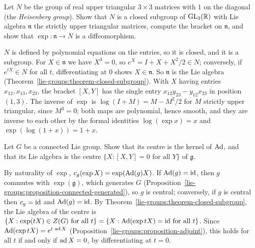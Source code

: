 \begin{exercise}\label{lie-groups:exercise-heisenberg}
Let $N$ be the group of real upper triangular $3 \times 3$ matrices with $1$ on the diagonal (the \emph{Heisenberg group}). Show that $N$ is a closed subgroup
of $\mathrm{GL}_3(\mathbb{R})$ with Lie algebra $\mathfrak{n}$ the strictly upper triangular matrices, compute the bracket on $\mathfrak{n}$, and show that
$\exp \colon \mathfrak{n} \to N$ is a diffeomorphism.
\end{exercise}

\begin{solution}
$N$ is defined by polynomial equations on the entries, so it is closed, and it is a subgroup. For $X \in \mathfrak{n}$ we have $X^3 = 0$, so
$e^X = I + X + X^2/2 \in N$; conversely, if $e^{tX} \in N$ for all $t$, differentiating at $0$ shows $X \in \mathfrak{n}$. So $\mathfrak{n}$ is the Lie algebra
(Theorem~\ref{lie-groups:theorem-closed-subgroup}). With $X$ having entries $x_{12}, x_{13}, x_{23}$, the bracket $[X, Y]$ has the single entry
$x_{12}y_{23} - y_{12}x_{23}$ in position $(1, 3)$. The inverse of $\exp$ is $\log(I + M) = M - M^2/2$ for $M$ strictly upper triangular, since $M^3 = 0$;
both maps are polynomial, hence smooth, and they are inverse to each other by the formal identities $\log(\exp x) = x$ and $\exp(\log(1 + x)) = 1 + x$.
\end{solution}

\begin{exercise}\label{lie-groups:exercise-centre}
Let $G$ be a connected Lie group. Show that its centre is the kernel of $\operatorname{Ad}$, and that its Lie algebra is the centre
$\{X : [X, Y] = 0 \text{ for all } Y\}$ of $\mathfrak{g}$.
\end{exercise}

\begin{solution}
By naturality of $\exp$, $c_g(\exp X) = \exp(\operatorname{Ad}(g)X)$. If $\operatorname{Ad}(g) = \mathrm{id}$, then $g$ commutes with $\exp(\mathfrak{g})$, which generates $G$
(Proposition~\ref{lie-groups:proposition-connected-generated}), so $g$ is central; conversely, if $g$ is central then $c_g = \mathrm{id}$ and $\operatorname{Ad}(g) = \mathrm{id}$. By
Theorem~\ref{lie-groups:theorem-closed-subgroup}, the Lie algebra of the centre is $\{X : \exp(tX) \in Z(G) \text{ for all } t\} = \{X : \operatorname{Ad}(\exp tX) = \mathrm{id}
\text{ for all } t\}$. Since $\operatorname{Ad}(\exp tX) = e^{t\,\operatorname{ad} X}$ (Proposition~\ref{lie-groups:proposition-adjoint}), this holds for all $t$ if and only if
$\operatorname{ad} X = 0$, by differentiating at $t = 0$.
\end{solution}

